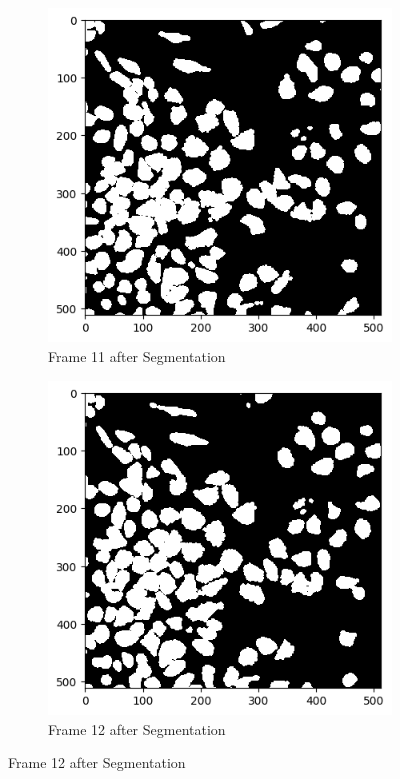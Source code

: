 \documentclass{article}
\begin{document}
\begin{figure}[h!]
  \begin{subfigure}{0.4\textwidth}
    \includegraphics[width=\linewidth]{Report/Appendix_Images/Segmentation-A-Control/frame_11.png}
    \caption*{Frame 11 after Segmentation}
  \end{subfigure}
  \hfill
  \begin{subfigure}{0.4\textwidth}
    \includegraphics[width=\linewidth]{Report/Appendix_Images/Segmentation-A-Control/frame_12.png}
    \caption*{Frame 12 after Segmentation}
  \end{subfigure}
\end{figure}
\end{document}
